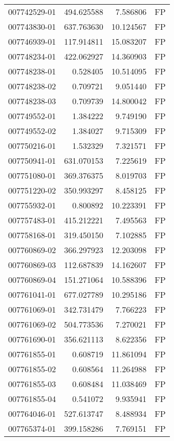 \begin{tabular}{lrrl}
007742529-01 &  494.625588 &     7.586806 &   FP \\
007743830-01 &  637.763630 &    10.124567 &   FP \\
007746939-01 &  117.914811 &    15.083207 &   FP \\
007748234-01 &  422.062927 &    14.360903 &   FP \\
007748238-01 &    0.528405 &    10.514095 &   FP \\
007748238-02 &    0.709721 &     9.051440 &   FP \\
007748238-03 &    0.709739 &    14.800042 &   FP \\
007749552-01 &    1.384222 &     9.749190 &   FP \\
007749552-02 &    1.384027 &     9.715309 &   FP \\
007750216-01 &    1.532329 &     7.321571 &   FP \\
007750941-01 &  631.070153 &     7.225619 &   FP \\
007751080-01 &  369.376375 &     8.019703 &   FP \\
007751220-02 &  350.993297 &     8.458125 &   FP \\
007755932-01 &    0.800892 &    10.223391 &   FP \\
007757483-01 &  415.212221 &     7.495563 &   FP \\
007758168-01 &  319.450150 &     7.102885 &   FP \\
007760869-02 &  366.297923 &    12.203098 &   FP \\
007760869-03 &  112.687839 &    14.162607 &   FP \\
007760869-04 &  151.271064 &    10.588396 &   FP \\
007761041-01 &  677.027789 &    10.295186 &   FP \\
007761069-01 &  342.731479 &     7.766223 &   FP \\
007761069-02 &  504.773536 &     7.270021 &   FP \\
007761690-01 &  356.621113 &     8.622356 &   FP \\
007761855-01 &    0.608719 &    11.861094 &   FP \\
007761855-02 &    0.608564 &    11.264988 &   FP \\
007761855-03 &    0.608484 &    11.038469 &   FP \\
007761855-04 &    0.541072 &     9.935941 &   FP \\
007764046-01 &  527.613747 &     8.488934 &   FP \\
007765374-01 &  399.158286 &     7.769151 &   FP \\

\end{tabular}
